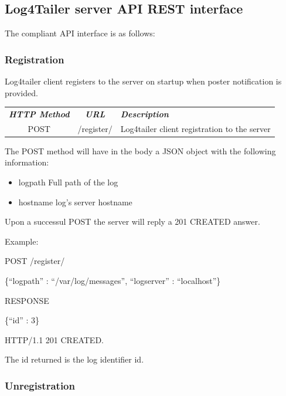 \subsection{Log4Tailer server API REST interface}

The compliant API interface is as follows:

\subsubsection{Registration}

Log4tailer client registers to the server on startup when poster notification is provided.

\begin{flushleft}
 \begin{tabular}{|c|c|l|}
 \hline 
 \rowcolor{cyan} {\color{white} \textit{\textbf{HTTP Method}}} &  {\color{white} 
  \textit{\textbf{URL}}}  & {\color{white} 
 \textit{\textbf{Description}}}\\
 POST & /register/ & Log4tailer client registration to the server\\
 \hline
\end{tabular}
\end{flushleft}
The POST method will have in the body a JSON object with the following information:

\begin{itemize}
 \item logpath Full path of the log 
 \item hostname log's server hostname
\end{itemize}

\noindent
Upon a successul POST the server will reply a 201 CREATED answer.

\noindent
Example:

\begin{codeexample}

POST /register/

 \{``logpath'' : ``/var/log/messages'', ``logserver'' : ``localhost''\} 

RESPONSE

 \{``id'' : 3\} 

HTTP/1.1 201 CREATED.
\end{codeexample}

The id returned is the log identifier id.

\subsubsection{Unregistration}

